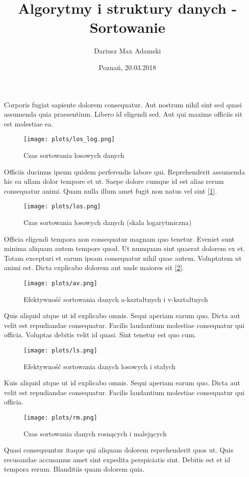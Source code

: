 \documentclass[10pt,twocolumn]{article}
\title{Algorytmy i struktury danych - Sortowanie}
\author{Dariusz Max Adamski}
\date{Poznań, 20.03.2018}
\begin{document}
\maketitle

Corporis fugiat sapiente dolorem consequatur. Aut nostrum nihil sint sed quasi assumenda quia praesentium. Libero id eligendi sed. Aut qui maxime officiis sit est molestiae ea.

\begin{figure}[h!]
	\texttt{[image: plots/los\_log.png]}
	\caption{Czas sortowania losowych danych \label{los}}
\end{figure}

Officiis ducimus ipsum quidem perferendis labore qui. Reprehenderit assumenda hic ea ullam dolor tempore et ut. Saepe dolore cumque id est alias rerum consequatur animi. Quam nulla illum amet fugit non natus vel sint [\ref{los}].

\begin{figure}
	\texttt{[image: plots/los.png]}
	\caption{Czas sortowania losowych danych (skala logarytmiczna) \label{los_log}}
\end{figure}

Officia eligendi tempora non consequatur magnam quo tenetur. Eveniet sunt minima aliquam autem tempore quod. Ut numquam sint quaerat dolorem ex et. Totam excepturi et earum ipsam consequatur nihil quae autem. Voluptatem ut animi est. Dicta explicabo dolorem aut unde maiores sit [\ref{los_log}].

\begin{figure}[h!]
	\texttt{[image: plots/av.png]}
	\caption{Efektywność sortowania danych a-kształtnych i v-kształtnych \label{aksz_vksz}}
\end{figure}

Quis aliquid atque ut id explicabo omnis. Sequi aperiam earum quo. Dicta aut velit est repudiandae consequatur. Facilis laudantium molestiae consequatur qui officia. Voluptas debitis velit id quasi. Sint tenetur est quo cum.

\begin{figure}[h!]
	\texttt{[image: plots/ls.png]}
	\caption{Efektywność sortowania danych losowych i stałych \label{los_sta}}
\end{figure}

Kuis aliquid atque ut id explicabo omnis. Sequi aperiam earum quo. Dicta aut velit est repudiandae consequatur. Facilis laudantium molestiae consequatur qui officia.

\begin{figure}[h!]
	\texttt{[image: plots/rm.png]}
	\caption{Czas sortowania danych rosnących i malejących \label{ros_mal}}
\end{figure}

Quasi consequuntur itaque qui aliquam dolorem reprehenderit quos ut. Quis recusandae accusamus amet sint expedita perspiciatis sint. Debitis est et id tempora rerum. Blanditiis quam dolorem quia.
\end{document}
